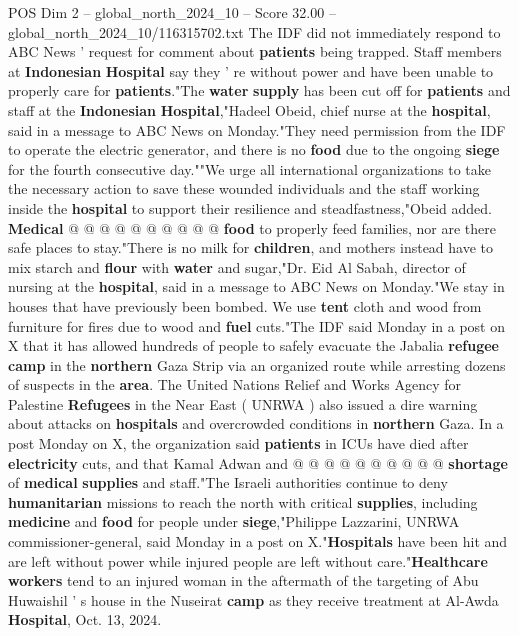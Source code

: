 \begin{textsample}{POS Dim 2 – global\_north\_2024\_10 – Score 32.00 – global\_north\_2024\_10/116315702.txt}
The IDF did not immediately respond to ABC News ' request for comment about \textbf{patients} being trapped.
Staff members at \textbf{Indonesian} \textbf{Hospital} say they ' re without power and have been unable to properly care for \textbf{patients}."The \textbf{water} \textbf{supply} has been cut off for \textbf{patients} and staff at the \textbf{Indonesian} \textbf{Hospital},"Hadeel Obeid, chief nurse at the \textbf{hospital}, said in a message to ABC News on Monday."They need permission from the IDF to operate the electric generator, and there is no \textbf{food} due to the ongoing \textbf{siege} for the fourth consecutive day.""We urge all international organizations to take the necessary action to save these wounded individuals and the staff working inside the \textbf{hospital} to support their resilience and steadfastness,"Obeid added. \textbf{Medical} @ @ @ @ @ @ @ @ @ @ \textbf{food} to properly feed families, nor are there safe places to stay."There is no milk for \textbf{children}, and mothers instead have to mix starch and \textbf{flour} with \textbf{water} and sugar,"Dr.
Eid Al Sabah, director of nursing at the \textbf{hospital}, said in a message to ABC News on Monday."We stay in houses that have previously been bombed.
We use \textbf{tent} cloth and wood from furniture for fires due to wood and \textbf{fuel} cuts."The IDF said Monday in a post on X that it has allowed hundreds of people to safely evacuate the Jabalia \textbf{refugee} \textbf{camp} in the \textbf{northern} Gaza Strip via an organized route while arresting dozens of suspects in the \textbf{area}.
The United Nations Relief and Works Agency for Palestine \textbf{Refugees} in the Near East ( UNRWA ) also issued a dire warning about attacks on \textbf{hospitals} and overcrowded conditions in \textbf{northern} Gaza.
In a post Monday on X, the organization said \textbf{patients} in ICUs have died after \textbf{electricity} cuts, and that Kamal Adwan and @ @ @ @ @ @ @ @ @ @ \textbf{shortage} of \textbf{medical} \textbf{supplies} and staff."The Israeli authorities continue to deny \textbf{humanitarian} missions to reach the north with critical \textbf{supplies}, including \textbf{medicine} and \textbf{food} for people under \textbf{siege},"Philippe Lazzarini, UNRWA commissioner-general, said Monday in a post on X."\textbf{Hospitals} have been hit and are left without power while injured people are left without care."\textbf{Healthcare} \textbf{workers} tend to an injured woman in the aftermath of the targeting of Abu Huwaishil ' s house in the Nuseirat \textbf{camp} as they receive treatment at Al-Awda \textbf{Hospital}, Oct. 13, 2024.

\end{textsample}
